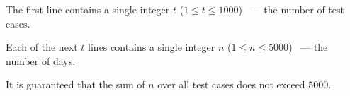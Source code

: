 The first line contains a single integer $t$ ($1 \le t \le 1000$) ~--- the number of test cases.

Each of the next $t$ lines contains a single integer $n$ ($1 \le n \le 5000$) ~--- the number of days.

It is guaranteed that the sum of $n$ over all test cases does not exceed $5000$.